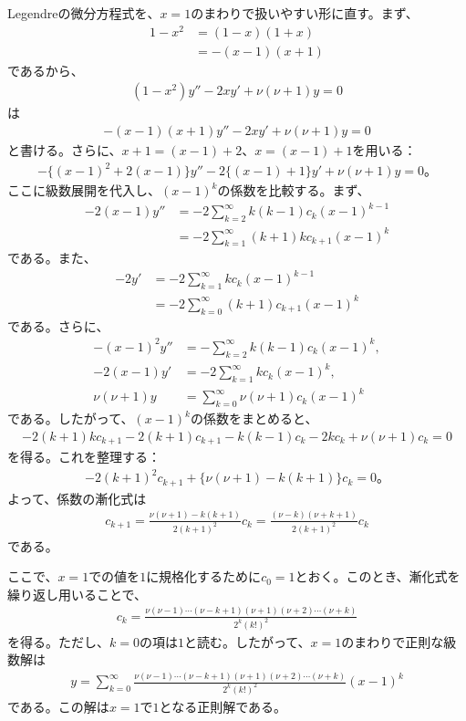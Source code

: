 \documentclass[platex,dvipdfmx,a4paper]{jsarticle}
\newcommand{\ssum}[3]{\sum_{#1=#2}^#3}
\begin{document}
  Legendreの微分方程式を、$x=1$のまわりで扱いやすい形に直す。まず、
  \begin{align*}
    1-x^2
    &=(1-x)(1+x)\\
    &=-(x-1)(x+1)
  \end{align*}
  であるから、
  \begin{align*}
    (1-x^2)y''-2xy'+\nu(\nu+1)y=0
  \end{align*}
  は
  \begin{align*}
    -(x-1)(x+1)y''-2xy'+\nu(\nu+1)y=0
  \end{align*}
  と書ける。さらに、$x+1=(x-1)+2$、$x=(x-1)+1$を用いる：
  \begin{align*}
    -\{(x-1)^2+2(x-1)\}y''
    -2\{(x-1)+1\}y'
    +\nu(\nu+1)y=0。
  \end{align*}
  ここに級数展開を代入し、$(x-1)^k$の係数を比較する。まず、
  \begin{align*}
    -2(x-1)y''
    &=
    -2\ssum{k}{2}{\infty}k(k-1)c_k(x-1)^{k-1}\\
    &=
    -2\ssum{k}{1}{\infty}(k+1)kc_{k+1}(x-1)^k
  \end{align*}
  である。また、
  \begin{align*}
    -2y'
    &=
    -2\ssum{k}{1}{\infty}kc_k(x-1)^{k-1}\\
    &=
    -2\ssum{k}{0}{\infty}(k+1)c_{k+1}(x-1)^k
  \end{align*}
  である。さらに、
  \begin{align*}
    -(x-1)^2y''
    &=
    -\ssum{k}{2}{\infty}k(k-1)c_k(x-1)^k,\\
    -2(x-1)y'
    &=
    -2\ssum{k}{1}{\infty}kc_k(x-1)^k,\\
    \nu(\nu+1)y
    &=
    \ssum{k}{0}{\infty}\nu(\nu+1)c_k(x-1)^k
  \end{align*}
  である。したがって、$(x-1)^k$の係数をまとめると、
  \begin{align*}
    -2(k+1)kc_{k+1}-2(k+1)c_{k+1}
    -k(k-1)c_k-2kc_k+\nu(\nu+1)c_k=0
  \end{align*}
  を得る。これを整理する：
  \begin{align*}
    -2(k+1)^2c_{k+1}+\{\nu(\nu+1)-k(k+1)\}c_k=0。
  \end{align*}
  よって、係数の漸化式は
  \begin{align*}
    c_{k+1}
    =
    \frac{\nu(\nu+1)-k(k+1)}{2(k+1)^2}c_k
    =
    \frac{(\nu-k)(\nu+k+1)}{2(k+1)^2}c_k
  \end{align*}
  である。
  
  ここで、$x=1$での値を$1$に規格化するために$c_0=1$とおく。このとき、漸化式を繰り返し用いることで、
  \begin{align*}
    c_k
    =
    \frac{\nu(\nu-1)\cdots(\nu-k+1)(\nu+1)(\nu+2)\cdots(\nu+k)}
         {2^k(k!)^2}
  \end{align*}
  を得る。ただし、$k=0$の項は$1$と読む。したがって、$x=1$のまわりで正則な級数解は
  \begin{align*}
    y
    =
    \ssum{k}{0}{\infty}
    \frac{\nu(\nu-1)\cdots(\nu-k+1)(\nu+1)(\nu+2)\cdots(\nu+k)}
         {2^k(k!)^2}
    (x-1)^k
  \end{align*}
  である。この解は$x=1$で$1$となる正則解である。
  
\end{document}
